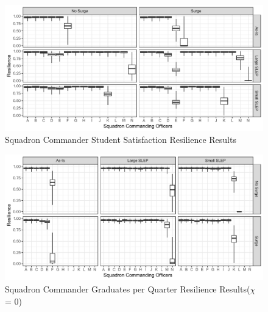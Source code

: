 \documentclass[preprint,12pt]{elsarticle}
\begin{document}


\begin{figure}[h]
  \centering\includegraphics[width=5in]{CO_Sat}
  \caption{Squadron Commander Student Satisfaction Resilience Results
  \label{f:CO_Sat}}
\end{figure}

\begin{figure}[h]
  \begin{center}
  \includegraphics[width=5in]{CO_Grad}
  \caption{Squadron Commander Graduates per Quarter Resilience
    Results($\chi$ = 0)
  \label{f:CO_Grad}}
  \end{center}
\end{figure}
\end{document}
